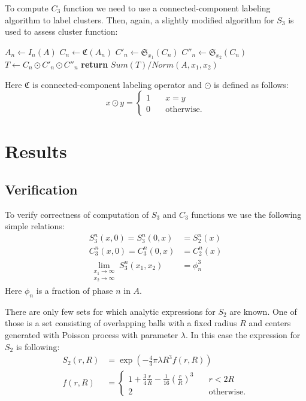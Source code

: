 \documentclass[reprint,amsmath,amssymb,aps,pre,showkeys,showpacs]{revtex4-1}
\begin{document}
To compute $C_3$ function we need to use a connected-component labeling
algorithm \cite{4728561,PhysRevB.14.3438} to label clusters. Then, again, a
slightly modified algorithm for $S_3$ is used to assess cluster function:
\begin{algorithmic}[1]
  \State $A_n \gets I_n (A)$
  \State $C_n \gets \mathfrak{C}(A_n)$
  \State $C'_n \gets \mathfrak{S}_{x_1}(C_n)$
  \State $C''_n \gets \mathfrak{S}_{x_2}(C_n)$
  \State $T \gets C_n \odot C'_n \odot C''_n$
  \State \textbf{return} $Sum(T) / Norm(A, x_1, x_2)$
  \EndProcedure
\end{algorithmic}
Here $\mathfrak{C}$ is connected-component labeling operator and $\odot$ is
defined as follows:
\begin{equation}
  x \odot y = \left\{
  \begin{array}{ll}
    1 & \quad x = y \\
    0 & \quad \text{otherwise}.
  \end{array}
  \right.
\end{equation}

\section{Results}
\label{sec:results}
\subsection{Verification}
To verify correctness of computation of $S_3$ and $C_3$ functions we use the
following simple relations:
\begin{align}
  S_3^n (x, 0) = S_3^n (0, x) &= S_2^n(x) \\
  C_3^n (x, 0) = C_3^n (0, x) &= C_2^n(x) \\
  \lim_{\substack{x_1 \to \infty \\ x_2 \to \infty}} S_3^n (x_1, x_2) &= \phi_n^3
\end{align}
Here $\phi_n$ is a fraction of phase $n$ in $A$.

There are only few sets for which analytic expressions for $S_2$ are known. One
of those is a set consisting of overlapping balls with a fixed radius $R$ and
centers generated with Poisson process with parameter $\lambda$. In this case
the expression for $S_2$ is following:
\begin{equation}
  \begin{aligned}
    S_2(r, R) &= \exp(-\frac{4}{3}\pi\lambda R^3 f(r, R)) \\
    f(r, R) &= \left\{
    \begin{array}{ll}
      1 + \frac{3}{4} \frac{r}{R} - \frac{1}{16} (\frac{r}{R})^3 & \quad r < 2R \\
      2 & \quad \text{otherwise}.
    \end{array}
    \right.
  \end{aligned}
  \label{eq:s2-balls}
\end{equation}
\end{document}

